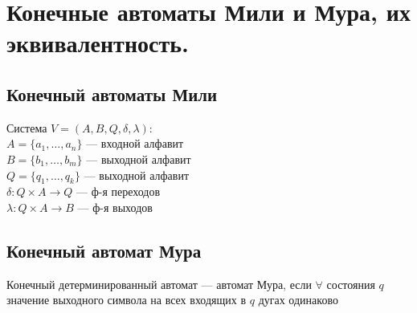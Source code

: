 \documentclass[12pt]{article}
\begin{document}
\section{Конечные автоматы Мили и Мура, их эквивалентность.}
\subsection{Конечный автоматы Мили}
	Система $V = (A, B, Q, \delta, \lambda)$:\\
	$A = \{a_1, \dotsc, a_n\}$ — входной алфавит\\
	$B = \{b_1, \dotsc, b_m\}$ — выходной алфавит\\
	$Q = \{q_1, \dotsc, q_k\}$ — выходной алфавит\\
	$\delta: Q \times A \to Q$ — ф-я переходов\\
	$\lambda: Q \times A \to B$ — ф-я выходов\\
\subsection{Конечный автомат Мура}
	Конечный детерминированный автомат — автомат Мура, если $\forall$ состояния $q$ значение выходного символа на всех входящих в $q$ дугах одинаково
\end{document}
